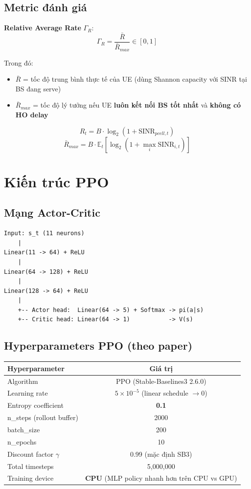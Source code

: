 \documentclass[11pt]{article}
\begin{document}
\subsection{Metric đánh giá}

\textbf{Relative Average Rate} $\Gamma_R$:
\[
\Gamma_R = \frac{\bar{R}}{\bar{R}_{max}} \in [0, 1]
\]

Trong đó:
\begin{itemize}
  \item $\bar{R}$ = tốc độ trung bình thực tế của UE (dùng Shannon capacity với SINR tại BS đang serve)
  \item $\bar{R}_{max}$ = tốc độ lý tưởng nếu UE \textbf{luôn kết nối BS tốt nhất} và \textbf{không có HO delay}
\end{itemize}

\[
R_t = B \cdot \log_2(1 + \text{SINR}_{pcell,t})
\]
\[
\bar{R}_{max} = B \cdot \mathbb{E}_t[\log_2(1 + \max_i \text{SINR}_{i,t})]
\]

\section{Kiến trúc PPO}

\subsection{Mạng Actor-Critic}

\begin{lstlisting}
Input: s_t (11 neurons)
    |
Linear(11 -> 64) + ReLU
    |
Linear(64 -> 128) + ReLU
    |
Linear(128 -> 64) + ReLU
    |
    +-- Actor head:  Linear(64 -> 5) + Softmax -> pi(a|s)
    +-- Critic head: Linear(64 -> 1)           -> V(s)
\end{lstlisting}

\subsection{Hyperparameters PPO (theo paper)}

\begin{longtable}{@{}lc@{}}
\toprule
\textbf{Hyperparameter} & \textbf{Giá trị} \\
\midrule
\endhead
Algorithm & PPO (Stable-Baselines3 2.6.0) \\
Learning rate & $5 \times 10^{-5}$ (linear schedule $\to 0$) \\
Entropy coefficient & \textbf{0.1} \\
n\_steps (rollout buffer) & 2000 \\
batch\_size & 200 \\
n\_epochs & 10 \\
Discount factor $\gamma$ & 0.99 (mặc định SB3) \\
Total timesteps & 5{,}000{,}000 \\
Training device & \textbf{CPU} (MLP policy nhanh hơn trên CPU vs GPU) \\
\bottomrule
\end{longtable}
\end{document}
